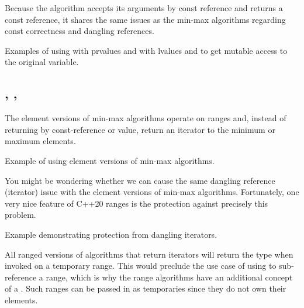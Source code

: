 Because the algorithm accepts its arguments by const reference and returns a const reference, it shares the same issues as the min-max algorithms regarding const correctness and dangling references.

\begin{box-note}
\footnotesize Examples of using  with prvalues and with lvalues and  to get mutable access to the original variable.
\tcblower
{}
\end{box-note}


\subsection{\texorpdfstring{, , }{\texttt{std::min\_element}, \texttt{std::max\_element}, \texttt{std::minmax\_element}}}

The element versions of min-max algorithms operate on ranges and, instead of returning by const-reference or value, return an iterator to the minimum or maximum elements.



\begin{box-note}
\footnotesize Example of using element versions of min-max algorithms.
\tcblower
{}
\end{box-note}

You might be wondering whether we can cause the same dangling reference (iterator) issue with the element versions of min-max algorithms. Fortunately, one very nice feature of C++20 ranges is the protection against precisely this problem.

\begin{box-note}
\footnotesize Example demonstrating protection from dangling iterators.
\tcblower
{}
\end{box-note}

All ranged versions of algorithms that return iterators will return the  type when invoked on a temporary range. This would preclude the use case of using  to sub-reference a range, which is why the range algorithms have an additional concept of a . Such ranges can be passed in as temporaries since they do not own their elements.